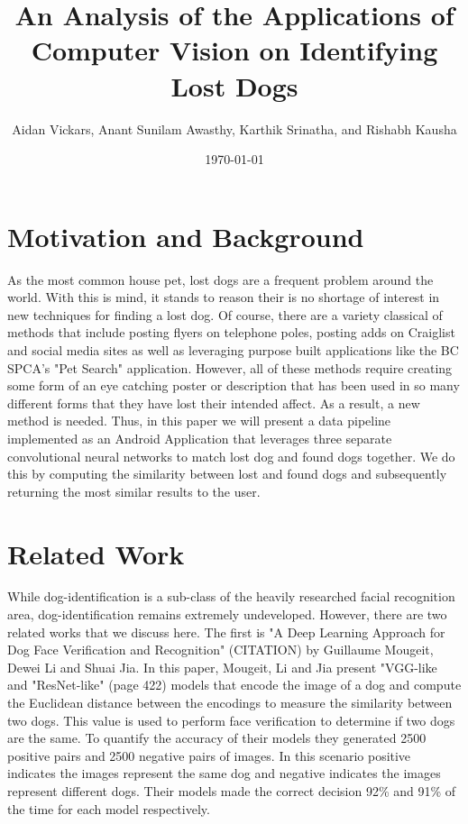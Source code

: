 \documentclass{article}
\title{An Analysis of the Applications of Computer Vision on Identifying Lost Dogs}
\author{Aidan Vickars, Anant Sunilam Awasthy, Karthik Srinatha, and Rishabh Kausha}
\date{\today}
\begin{document}
\maketitle

\newpage
\section{Motivation and Background}
As the most common house pet, lost dogs are a frequent problem around the world.  With this is mind, it stands to reason their is no shortage of interest in new techniques for finding a lost dog.  Of course, there are a variety classical of methods that include posting flyers on telephone poles, posting adds on Craiglist and social media sites as well as leveraging purpose built applications like the BC SPCA's "Pet Search" application.  However, all of these methods require creating some form of an eye catching poster or description that has been used in so many different forms that they have lost their intended affect.  As a result, a new method is needed.  Thus, in this paper we will present a data pipeline implemented as an Android Application that leverages three separate convolutional neural networks to match lost dog and found dogs together.  We do this by computing the similarity between lost and found dogs and subsequently returning the most similar results to the user.

\section{Related Work}
	While dog-identification is a sub-class of the heavily researched facial recognition area, dog-identification remains extremely undeveloped.  However, there are two related works that we discuss here.  The first is "A Deep Learning Approach for Dog Face Verification and Recognition" (CITATION)  by  Guillaume Mougeit, Dewei Li and Shuai Jia.  In this paper, Mougeit, Li and Jia present "VGG-like and "ResNet-like" (page 422) models that encode the image of a dog and compute the Euclidean distance between the encodings to measure the similarity between two dogs.  This value is used to perform face verification to determine if two dogs are the same.  To quantify the accuracy of their models they generated 2500 positive pairs and 2500 negative pairs of images.  In this scenario positive indicates the images represent the same dog and negative indicates the images represent different dogs.  Their models made the correct decision 92\% and 91\% of the time for each model respectively.
\end{document}
